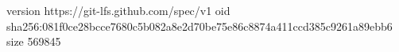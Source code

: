version https://git-lfs.github.com/spec/v1
oid sha256:081f0ce28bcce7680c5b082a8e2d70be75e86c8874a411ccd385c9261a89ebb6
size 569845
